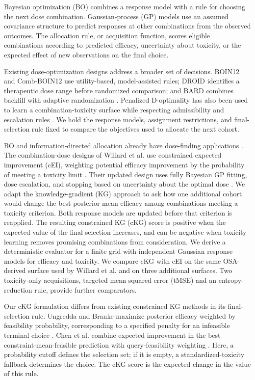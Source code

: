 \documentclass[11pt]{article}
\newcommand{\rev}[1]{{#1}}
\begin{document}
\rev{Bayesian optimization (BO) combines a response model with a rule for choosing the next dose combination. Gaussian-process (GP) models use an assumed covariance structure to predict responses at other combinations from the observed outcomes. The allocation rule, or acquisition function, scores eligible combinations according to predicted efficacy, uncertainty about toxicity, or the expected effect of new observations on the final choice.}

Existing dose-optimization designs address a broader set of decisions. BOIN12 and Comb-BOIN12 use utility-based, model-assisted rules; DROID identifies a therapeutic dose range before randomized comparison; and BARD combines backfill with adaptive randomization \citep{lin2020,lu2025combboin,guo2023,zhao2025}. \rev{Penalized D-optimality has also been used} to learn a combination-toxicity surface while respecting admissibility and escalation rules \citep{ajimi2026}. \rev{We hold the response models, assignment restrictions, and final-selection rule fixed to compare the objectives used to allocate the next cohort.}

BO and information-directed allocation already have dose-finding applications \citep{domenicano2019,takahashi2021,willard2025}. \rev{The combination-dose designs of Willard et al. use constrained expected improvement (cEI), weighting potential efficacy improvement by the probability of meeting a toxicity limit} \citep{willardobd,willardobd2026}. \rev{Their updated design uses fully Bayesian GP fitting, dose escalation, and stopping based on uncertainty about the optimal dose} \citep{willardobd2026}. \rev{We adapt the knowledge-gradient (KG) approach} \citep{frazier2009,scott2011,chen2021,ungredda2024} to ask how one additional cohort would change the best posterior mean efficacy among combinations meeting a toxicity criterion. Both response models are updated before that criterion is reapplied. \rev{The resulting constrained KG (cKG) score is positive when the expected value of the final selection increases, and can be negative when toxicity learning removes promising combinations from consideration. We derive a deterministic evaluator for a finite grid with independent Gaussian response models for efficacy and toxicity.} \rev{We compare cKG with cEI on the same OSA-derived surface used by Willard et al. and on three additional surfaces.} Two toxicity-only acquisitions, targeted mean squared error (tMSE) and an entropy-reduction rule, provide further comparators.

\rev{Our cKG formulation differs from existing constrained KG methods in its final-selection rule. Ungredda and Branke maximize posterior efficacy weighted by feasibility probability, corresponding to a specified penalty for an infeasible terminal choice \citep{ungredda2024}. Chen et al. combine expected improvement in the best constraint-mean-feasible prediction with query-feasibility weighting \citep{chen2021}. Here, a probability cutoff defines the selection set; if it is empty, a standardized-toxicity fallback determines the choice. The cKG score is the expected change in the value of this rule.}
\end{document}
